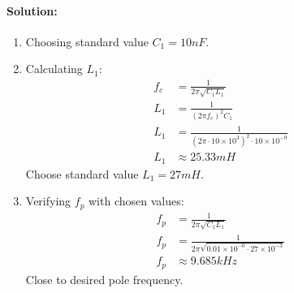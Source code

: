 \paragraph{Solution:}
\begin{enumerate}
  \item Choosing standard value \(C_1 = 10 nF\).
  \item Calculating $L_1$:
    \begin{align*}
      f_c &= \frac{1}{2 \pi \sqrt{C_1L_1}} \\
      L_1 &= \frac{1}{(2 \pi f_c)^2 C_1} \\
      L_1 &= \frac{1}{(2 \pi \cdot 10 \times 10^3)^2 \cdot 10 \times 10^{-9}} \\
      L_1 &\approx 25.33 mH
    \end{align*}
    Choose standard value \(L_1 = 27 mH\).
  \item Verifying $f_p$ with chosen values:
    \begin{align*}
      f_p &= \frac{1}{2 \pi \sqrt{C_1L_1}} \\
      f_p &= \frac{1}{2 \pi \sqrt{0.01 \times 10^{-6} \cdot 27 \times 10^{-3}}} \\
      f_p &\approx 9.685 kHz
    \end{align*}
    Close to desired pole frequency.
\end{enumerate}

